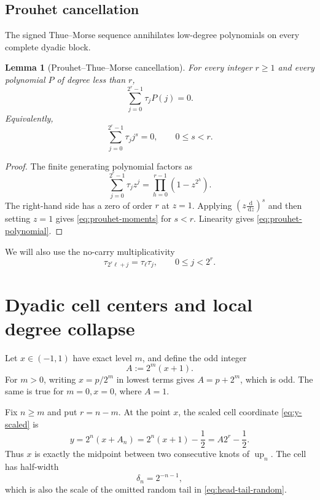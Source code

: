 \documentclass[11pt,oneside]{article}
\newtheorem{lemma}[theorem]{Lemma}
\theoremstyle{definition}
\theoremstyle{remark}
\newcommand{\up}{\operatorname{up}}
\newcommand{\dd}{\,\mathrm d}
\begin{document}
\subsection{Prouhet cancellation}

The signed Thue--Morse sequence annihilates low-degree polynomials on every
complete dyadic block.

\begin{lemma}[Prouhet--Thue--Morse cancellation]\label{lem:prouhet}
For every integer \(r\ge1\) and every polynomial \(P\) of degree less than
\(r\),
\begin{equation}\label{eq:prouhet-polynomial}
 \sum_{j=0}^{2^r-1}\tau_jP(j)=0.
\end{equation}
Equivalently,
\begin{equation}\label{eq:prouhet-moments}
 \sum_{j=0}^{2^r-1}\tau_jj^s=0,
 \qquad 0\le s<r.
\end{equation}
\end{lemma}

\begin{proof}
The finite generating polynomial factors as
\begin{equation}\label{eq:TM-factor}
 \sum_{j=0}^{2^r-1}\tau_jz^j
 =\prod_{h=0}^{r-1}(1-z^{2^h}).
\end{equation}
The right-hand side has a zero of order \(r\) at \(z=1\).  Applying
\((z\frac{\dd}{\dd z})^s\) and then setting \(z=1\) gives
\eqref{eq:prouhet-moments} for \(s<r\).  Linearity gives
\eqref{eq:prouhet-polynomial}.
\end{proof}

We will also use the no-carry multiplicativity
\begin{equation}\label{eq:no-carry}
 \tau_{2^r\ell+j}=\tau_\ell\tau_j,
 \qquad 0\le j<2^r.
\end{equation}

\section{Dyadic cell centers and local degree collapse}

Let \(x\in(-1,1)\) have exact level \(m\), and define the odd integer
\begin{equation}\label{eq:A-dyadic}
 A:=2^m(x+1).
\end{equation}
For \(m>0\), writing \(x=p/2^m\) in lowest terms gives \(A=p+2^m\), which
is odd.  The same is true for \(m=0,x=0\), where \(A=1\).

Fix \(n\ge m\) and put \(r=n-m\).  At the point \(x\), the scaled cell
coordinate \eqref{eq:y-scaled} is
\begin{equation}\label{eq:midpoint-coordinate}
 y=2^n(x+A_n)
   =2^n(x+1)-\frac12
   =A2^r-\frac12.
\end{equation}
Thus \(x\) is exactly the midpoint between two consecutive knots of
\(\up_n\).  The cell has half-width
\begin{equation}\label{eq:cell-halfwidth}
 \delta_n=2^{-n-1},
\end{equation}
which is also the scale of the omitted random tail in
\eqref{eq:head-tail-random}.
\end{document}
